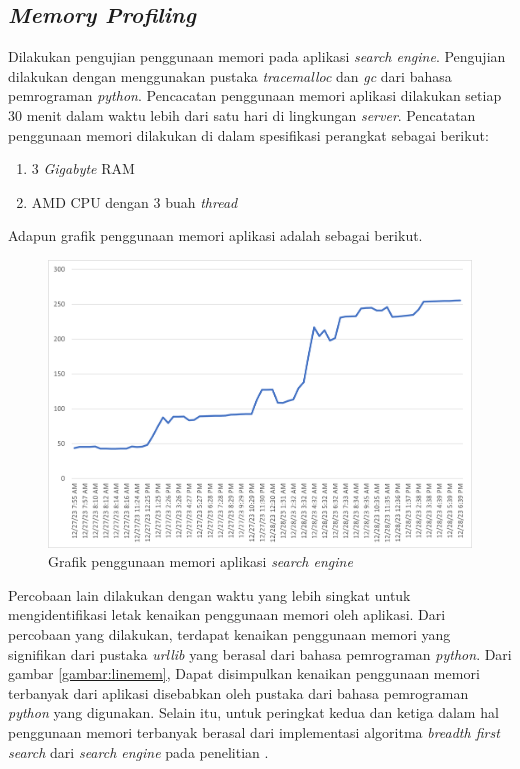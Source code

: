\documentclass[
	a4paper, %
	10pt, %
	unnumberedsections, %
	twoside, %
]{LTJournalArticle}
\begin{document}
\subsection{\textit{Memory Profiling}}
Dilakukan pengujian penggunaan memori pada aplikasi \textit{search engine}. Pengujian dilakukan dengan menggunakan pustaka \textit{tracemalloc} dan \textit{gc} dari bahasa pemrograman \textit{python}. Pencacatan penggunaan memori aplikasi dilakukan setiap 30 menit dalam waktu lebih dari satu hari di lingkungan \textit{server}. Pencatatan penggunaan memori dilakukan di dalam spesifikasi perangkat sebagai berikut: 

\begin{enumerate}
	\item 3 \textit{Gigabyte} RAM 
	\item AMD CPU dengan 3 buah \textit{thread}
\end{enumerate}

Adapun grafik penggunaan memori aplikasi adalah sebagai berikut.


\begin{figure}[H]
	\includegraphics[width=\linewidth]{memchart.png}
	\caption{Grafik penggunaan memori aplikasi \textit{search engine}}
\end{figure}


Percobaan lain dilakukan dengan waktu yang lebih singkat untuk mengidentifikasi letak kenaikan penggunaan memori oleh aplikasi. Dari percobaan yang dilakukan, terdapat kenaikan penggunaan memori yang signifikan dari pustaka \textit{urllib} yang berasal dari bahasa pemrograman \textit{python}. Dari gambar \ref{gambar:linemem}, Dapat disimpulkan kenaikan penggunaan memori terbanyak dari aplikasi disebabkan oleh pustaka dari bahasa pemrograman \textit{python} yang digunakan. Selain itu, untuk peringkat kedua dan ketiga dalam hal penggunaan memori terbanyak berasal dari implementasi algoritma \textit{breadth first search} dari \textit{search engine} pada penelitian \cite{lazu}.
\end{document}
